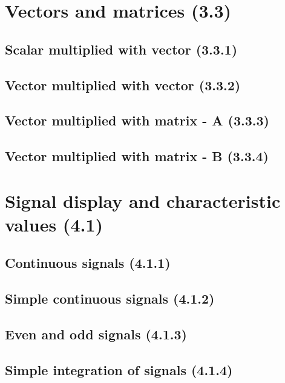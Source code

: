 \documentclass[12pt,paper=A4,english,headings=small,footlines=2.1,footheight=15mm]{scrreprt}
\begin{document}


\tableofcontents

\cleardoublepage

\chapter{Vectors and matrices (3.3)}

\section{Scalar multiplied with vector (3.3.1)}


\section{Vector multiplied with vector (3.3.2)}


\section{Vector multiplied with matrix - A (3.3.3)}


\section{Vector multiplied with matrix - B (3.3.4)}


\chapter{Signal display and characteristic values (4.1)}

\section{Continuous signals (4.1.1)}


\section{Simple continuous signals (4.1.2)}


\section{Even and odd signals (4.1.3)}


\section{Simple integration of signals (4.1.4)}

\end{document}
